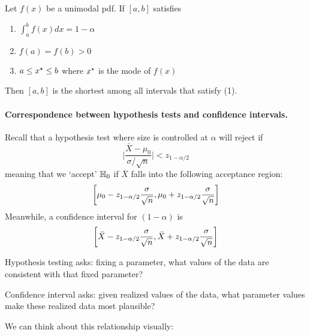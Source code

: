 \documentclass[10pt]{article}
\begin{document}
\begin{theorem}
	Let $f(x)$ be a unimodal pdf. If $[a,b]$ satisfies
	\begin{enumerate}
		\item $\int_a^b f(x)dx = 1-\alpha$
		\item $f(a) = f(b) > 0$
		\item $a \le x^\star \le b$ where $x^\star$ is the mode of $f(x)$
	\end{enumerate}
	Then $[a,b]$ is the shortest among all intervals that satisfy (1).
\end{theorem}

\paragraph{Correspondence between hypothesis tests and confidence intervals.} Recall that a hypothesis test where size is controlled at $\alpha$ will reject if
\[
\Bigg| \frac{\bar{X}-\mu_0}{\sigma / \sqrt{n}} \Bigg| < z_{1 - \alpha / 2}
\]
meaning that we `accept' $\mathbb{H}_0$ if $\bar{X}$ falls into the following acceptance region:
\[
\left[ \mu_0 - z_{1-\alpha / 2} \frac{\sigma}{\sqrt{n}} , \mu_0 + z_{1-\alpha / 2} \frac{\sigma}{\sqrt{n}}\right]
\]
Meanwhile, a confidence interval for $(1-\alpha)$ is
\[
\left[ \bar{X} - z_{1-\alpha / 2} \frac{\sigma}{\sqrt{n}} , \bar{X} + z_{1-\alpha / 2} \frac{\sigma}{\sqrt{n}}\right]
\]
\begin{remark}
	Hypothesis testing asks: fixing a parameter, what values of the data are consistent with that fixed parameter?
	
	Confidence interval asks: given realized values of the data, what parameter values make these realized data most plausible?
\end{remark}

We can think about this relationship visually:
\end{document}
